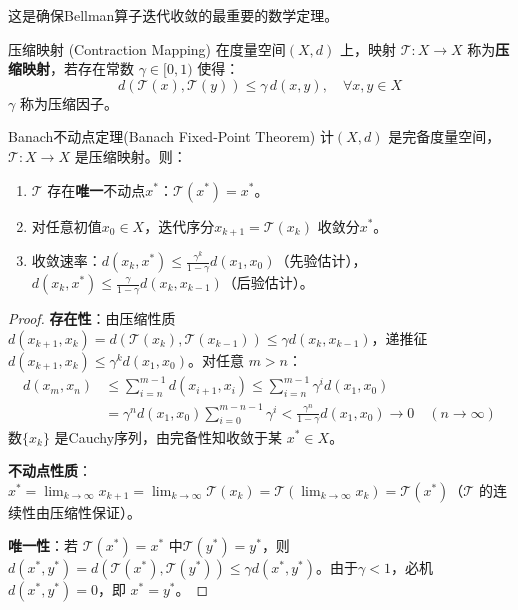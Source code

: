 这是确保Bellman算子迭代收敛的最重要的数学定理。

\begin{mydefinition}{压缩映射 (Contraction Mapping)}
在度量空间$(X, d)$ 上，映射 $\mathcal{T}: X \to X$ 称为\textbf{压缩映射}，若存在常数 $\gamma \in [0, 1)$ 使得：
\[
d(\mathcal{T}(x), \mathcal{T}(y)) \le \gamma \, d(x, y), \quad \forall x, y \in X
\]
$\gamma$ 称为压缩因子。
\end{mydefinition}

\begin{myTheorem}{Banach不动点定理(Banach Fixed-Point Theorem)}
计$(X, d)$ 是完备度量空间，$\mathcal{T}: X \to X$ 是压缩映射。则：
\begin{enumerate}
    \item $\mathcal{T}$ 存在\textbf{唯一}不动点$x^*$：$\mathcal{T}(x^*) = x^*$。
    \item 对任意初值$x_0 \in X$，迭代序分$x_{k+1} = \mathcal{T}(x_k)$ 收敛分$x^*$。
    \item 收敛速率：$d(x_k, x^*) \le \frac{\gamma^k}{1 - \gamma} d(x_1, x_0)$（先验估计），$d(x_k, x^*) \le \frac{\gamma}{1 - \gamma} d(x_k, x_{k-1})$（后验估计）。
\end{enumerate}
\end{myTheorem}

\begin{proof}
\textbf{存在性}：由压缩性质 $d(x_{k+1}, x_k) = d(\mathcal{T}(x_k), \mathcal{T}(x_{k-1})) \le \gamma d(x_k, x_{k-1})$，递推征$d(x_{k+1}, x_k) \le \gamma^k d(x_1, x_0)$。对任意 $m > n$：
\begin{align*}
d(x_m, x_n) &\le \sum_{i=n}^{m-1} d(x_{i+1}, x_i) \le \sum_{i=n}^{m-1} \gamma^i d(x_1, x_0) \\
&= \gamma^n d(x_1, x_0) \sum_{i=0}^{m-n-1} \gamma^i < \frac{\gamma^n}{1 - \gamma} d(x_1, x_0) \to 0 \quad (n \to \infty)
\end{align*}
数$\{x_k\}$ 是Cauchy序列，由完备性知收敛于某 $x^* \in X$。

\textbf{不动点性质}：$x^* = \lim_{k \to \infty} x_{k+1} = \lim_{k \to \infty} \mathcal{T}(x_k) = \mathcal{T}(\lim_{k \to \infty} x_k) = \mathcal{T}(x^*)$（$\mathcal{T}$ 的连续性由压缩性保证）。

\textbf{唯一性}：若 $\mathcal{T}(x^*) = x^*$ 中$\mathcal{T}(y^*) = y^*$，则 $d(x^*, y^*) = d(\mathcal{T}(x^*), \mathcal{T}(y^*)) \le \gamma d(x^*, y^*)$。由于$\gamma < 1$，必机$d(x^*, y^*) = 0$，即 $x^* = y^*$。
\end{proof}

